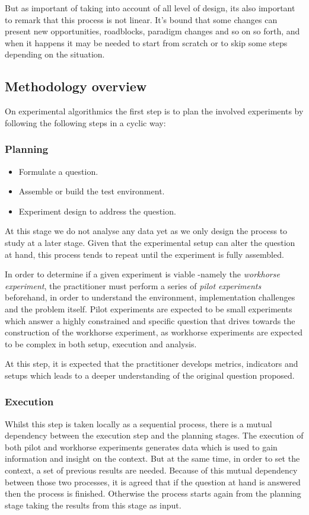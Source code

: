 But as important of taking into account of all level of design, its also important to remark that this process is not linear. It's bound that some changes can present new opportunities, roadblocks, paradigm changes and so on so forth, and when it happens it may be needed to start from scratch or to skip some steps depending on the situation.


\subsection{Methodology overview}

On experimental algorithmics the first step is to plan the involved experiments by following the following steps in a cyclic way:

\subsubsection{Planning}
\begin{itemize}
    \item Formulate a question.
    \item Assemble or build the test environment.
    \item Experiment design to address the question.
\end{itemize}

At this stage we do not analyse any data yet as we only design the process to study at a later stage. Given that the experimental setup can alter the question at hand, this process tends to repeat until the experiment is fully assembled.

In order to determine if a given experiment is viable -namely the \emph{workhorse experiment}, the practitioner must perform a series of \emph{pilot experiments} beforehand, in order to understand the environment, implementation challenges and the problem itself. Pilot experiments are expected to be small experiments which answer a highly constrained and specific question that drives towards the construction of the workhorse experiment, as workhorse experiments are expected to be complex in both setup, execution and analysis.

At this step, it is expected that the practitioner develops metrics, indicators and setups which leads to a deeper understanding of the original question proposed.

\subsubsection{Execution}
Whilst this step is taken locally as a sequential process, there is a mutual dependency between the execution step and the planning stages. The execution of both pilot and workhorse experiments generates data which is used to gain information and insight on the context. But at the same time, in order to set the context, a set of previous results are needed. Because of this mutual dependency between those two processes, it is agreed that if the question at hand is answered then the process is finished. Otherwise the process starts again from the planning stage taking the results from this stage as input.

